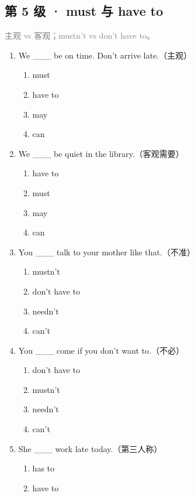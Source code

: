 \documentclass[11pt,a4paper]{ctexart}
\begin{document}
\subsection*{第 5 级 · must 与 have to}
\noindent\textcolor{gray}{主观 vs 客观；mustn’t vs don’t have to。}\par\smallskip
\begin{enumerate}[leftmargin=*,itemsep=4pt]
\item We \_\_\_ be on time. Don’t arrive late.（主观）
\begin{enumerate}[label=\Alph*.,leftmargin=2em,itemsep=1pt,topsep=2pt]
\item must
\item have to
\item may
\item can
\end{enumerate}
\item We \_\_\_ be quiet in the library.（客观需要）
\begin{enumerate}[label=\Alph*.,leftmargin=2em,itemsep=1pt,topsep=2pt]
\item have to
\item must
\item may
\item can
\end{enumerate}
\item You \_\_\_ talk to your mother like that.（不准）
\begin{enumerate}[label=\Alph*.,leftmargin=2em,itemsep=1pt,topsep=2pt]
\item mustn’t
\item don’t have to
\item needn’t
\item can’t
\end{enumerate}
\item You \_\_\_ come if you don’t want to.（不必）
\begin{enumerate}[label=\Alph*.,leftmargin=2em,itemsep=1pt,topsep=2pt]
\item don’t have to
\item mustn’t
\item needn’t
\item can’t
\end{enumerate}
\item She \_\_\_ work late today.（第三人称）
\begin{enumerate}[label=\Alph*.,leftmargin=2em,itemsep=1pt,topsep=2pt]
\item has to
\item have to

\end{enumerate}
\end{enumerate}
\end{document}
